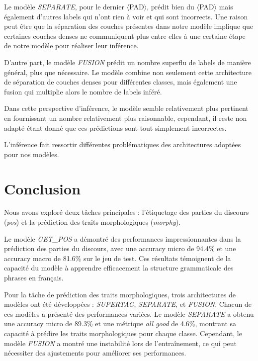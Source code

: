 \documentclass[a4paper]{article}
\begin{document}
Le modèle \textit{SEPARATE}, pour le dernier $\langle$PAD$\rangle$, prédit bien du $\langle$PAD$\rangle$ mais également d'autres labels qui n'ont rien à voir et qui sont incorrects. Une raison peut être que la séparation des couches présentes dans notre modèle implique que certaines couches denses ne communiquent plus entre elles à une certaine étape de notre modèle pour réaliser leur inférence.

D'autre part, le modèle \textit{FUSION} prédit un nombre superflu de labels de manière général, plus que nécessaire. Le modèle combine non seulement cette architecture de séparation de couches denses pour différentes classes, mais également une fusion qui multiplie alors le nombre de labels inféré. 

Dans cette perspective d'inférence, le modèle  semble relativement plus pertinent en fournissant un nombre relativement plus raisonnable, cependant, il reste non adapté étant donné que ces prédictions sont tout simplement incorrectes. 

L'inférence fait ressortir différentes problématiques des architectures adoptées pour nos modèles.

\section{Conclusion}

Nous avons exploré deux tâches principales : l'étiquetage des parties du discours (\textit{pos}) et la prédiction des traits
morphologiques (\textit{morphy}). 

Le modèle \textit{GET\_POS} a démontré des performances impressionnantes dans la prédiction des parties du discours, avec une
accuracy micro de 94.4\% et une accuracy macro de 81.6\% sur le jeu de test. Ces résultats témoignent de la capacité du modèle
à apprendre efficacement la structure grammaticale des phrases en français.

Pour la tâche de prédiction des traits morphologiques, trois architectures de modèles ont été développées : \textit{SUPERTAG},
\textit{SEPARATE}, et \textit{FUSION}. Chacun de ces modèles a présenté des performances variées. Le modèle \textit{SEPARATE} a
obtenu une accuracy micro de 89.3\% et une métrique \textit{all good} de 4.6\%, montrant sa capacité à prédire les traits
morphologiques pour chaque classe. Cependant, le modèle \textit{FUSION} a montré une instabilité lors de l'entraînement, ce
qui peut nécessiter des ajustements pour améliorer ses performances.
\end{document}
